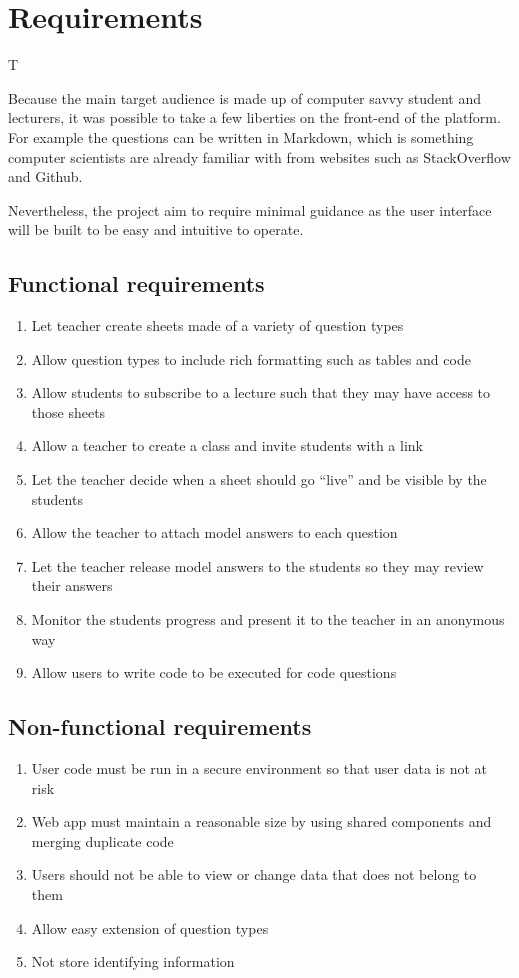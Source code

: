 
\chapter{Requirements}
T

Because the main target audience is made up of computer savvy student and lecturers, it was possible to take a few liberties on the front-end of the platform. For example the questions can be written in Markdown, which is something computer scientists are already familiar with from websites such as StackOverflow and Github.

Nevertheless, the project aim to require minimal guidance as the user interface will be built to be easy and intuitive to operate.

\section{Functional requirements}
\begin{enumerate}
\item   Let teacher create sheets made of a variety of question types
\item 	Allow question types to include rich formatting such as tables and code
\item 	Allow students to subscribe to a lecture such that they may have access to those sheets
\item 	Allow a teacher to create a class and invite students with a link
\item 	Let the teacher decide when a sheet should go “live” and be visible by the students
\item 	Allow the teacher to attach model answers to each question
\item   Let the teacher release model answers to the students so they may review their answers
\item 	Monitor the students progress and present it to the teacher in an anonymous way
\item   Allow users to write code to be executed for code questions
\end{enumerate}


\section{Non-functional requirements}
\begin{enumerate}
	\item User code must be run in a secure environment so that user data is not at risk
	\item Web app must maintain a reasonable size by using shared components and merging duplicate code
	\item Users should not be able to view or change data that does not belong to them
	\item Allow easy extension of question types
	\item Not store identifying information
\end{enumerate}